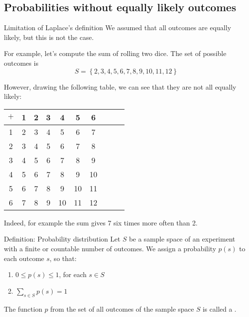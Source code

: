 \documentclass[a4paper]{article}
\begin{document}
\subsection{Probabilities without equally likely outcomes}
\begin{parag}{Limitation of Laplace's definition}
    We assumed that all outcomes are equally likely, but this is not the case.

    For example, let's compute the sum of rolling two dice. The set of possible outcomes is 
    \[S = \left\{2, 3, 4, 5, 6, 7, 8, 9, 10, 11, 12\right\}\]
    
    However, drawing the following table, we can see that they are not all equally likely:
    \begin{center}
    \begin{tabular}{c|ccccccccc}
        $+$ & 1  & 2  & 3  & 4  & 5  & 6  \\
        \hline
        1 & 2  & 3  & 4  & 5  & 6  & 7  \\
        2 & 3  & 4  & 5  & 6  & 7  & 8  \\
        3 & 4  & 5  & 6  & 7  & 8  & 9  \\
        4 & 5  & 6  & 7  & 8  & 9  & 10 \\
        5 & 6  & 7  & 8  & 9  & 10 & 11 \\
        6 & 7  & 8  & 9  & 10 & 11 & 12 \\
    \end{tabular}
    \end{center}

    Indeed, for example the sum gives 7 six times more often than 2.
\end{parag}

\begin{parag}{Definition: Probability distribution}
    Let $S$ be a sample space of an experiment with a finite or countable number of outcomes. We assign a probability $p\left(s\right)$ to each outcome $s$, so that:
    \begin{enumerate}
        \item $0 \leq p\left(s\right) \leq 1$, for each $s \in S$
        \item $\displaystyle \sum_{s \in S}^{} p\left(s\right) = 1$
    \end{enumerate}
    
    The function $p$ from the set of all outcomes of the sample space $S$ is called a .
\end{parag}
\end{document}
